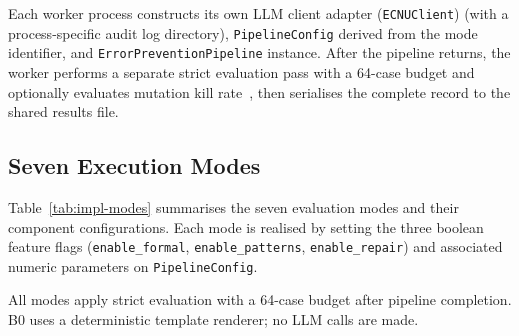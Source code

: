 Each worker process constructs its own LLM client adapter (\texttt{ECNUClient}) (with a
process-specific audit log directory), \texttt{PipelineConfig} derived from
the mode identifier, and \texttt{ErrorPreventionPipeline} instance.  After
the pipeline returns, the worker performs a separate strict evaluation pass
with a 64-case budget and optionally evaluates mutation
kill rate~\citep{demillo1978mutation,li2023iet}, then serialises the complete
record to the shared results file.

\subsection{Seven Execution Modes}

Table~\ref{tab:impl-modes} summarises the seven evaluation modes and their
component configurations.  Each mode is realised by setting the three
boolean feature flags (\texttt{enable\_formal}, \texttt{enable\_patterns},
\texttt{enable\_repair}) and associated numeric parameters on
\texttt{PipelineConfig}.

\begin{table}[t]
  \caption{Execution mode configuration matrix.  Flags control which
           pipeline stages are active; numeric parameters tune per-stage
           behaviour.  All LLM-based modes use Qwen2.5-27B-Instruct (\textsf{Qwen-27B})
           with $K = 3$ unless noted.
           $N_{\max}$ is the per-scenario formal case cap.}
  \label{tab:impl-modes}
  \centering
  \par\smallskip
  \raggedright\footnotesize All modes apply strict evaluation with a
  64-case budget after pipeline completion.
  B0 uses a deterministic template renderer; no LLM calls are made.
\end{table}

